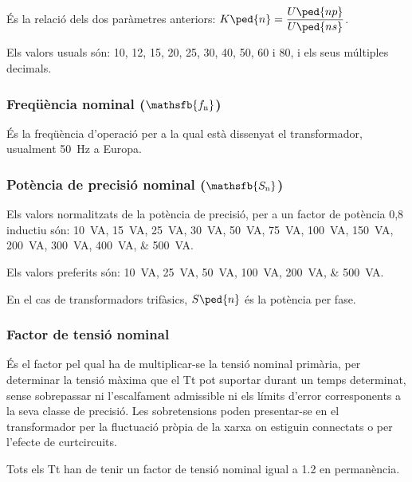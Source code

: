  És la relació  dels dos paràmetres anteriors: $K\ped{n} = \dfrac{U\ped{np}}{U\ped{ns}}$.

 Els valors usuals són: 10, 12, 15, 20, 25, 30, 40, 50, 60 i 80, i els seus múltiples decimals.

\subsubsection{Freqüència nominal ($\mathsfb{f_\text{n}}$)}

 És la freqüència d'operació per a la qual  està dissenyat el transformador, usualment \qty{50}{Hz} a Europa.

\subsubsection{Potència de precisió nominal ($\mathsfb{S_\text{n}}$)}

Els valors normalitzats de la potència de precisió, per
a un factor de potència 0,8 inductiu són: \qtylist{10; 15; 25; 30; 50; 75; 100; 150;
 200; 300; 400; 500}{VA}.

 Els valors preferits són: \qtylist{10; 25; 50; 100; 200; 500}{VA}.

En el cas de transformadors trifàsics, $S\ped{n}$ és la potència per fase.

\subsubsection{Factor de tensió nominal}

 És el factor pel qual ha de
multiplicar-se la tensió nominal primària, per  determinar la
tensió màxima que el Tt pot suportar durant un temps determinat,
sense sobrepassar ni l'escalfament admissible ni els límits d'error
corresponents a la seva classe de precisió. Les sobretensions poden
presentar-se en el transformador  per la fluctuació
pròpia de la xarxa on estiguin connectats o per l'efecte de curtcircuits.

Tots els  Tt han de tenir un factor de tensió nominal igual a \num{1,2} en permanència.

